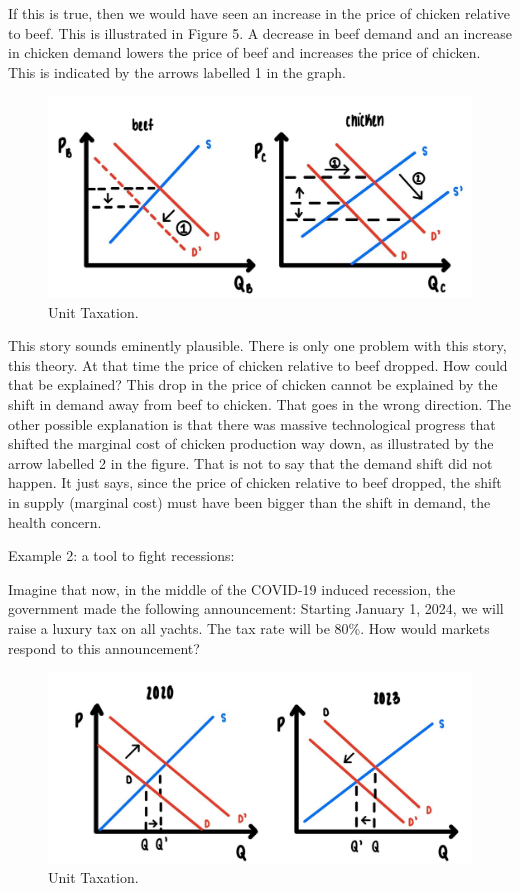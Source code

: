 \documentclass[
]{book}
\begin{document}
If this is true, then we would have seen an increase in the price of chicken relative to beef. This is illustrated in Figure 5. A decrease in beef demand and an increase in chicken demand lowers the price of beef and increases the price of chicken. This is indicated by the arrows labelled 1 in the graph.

\begin{figure}

{\centering \includegraphics[width=0.5\linewidth]{img/compmarkets/fig5} 

}

\caption{Unit Taxation.}\label{fig:compmarkets05}
\end{figure}

This story sounds eminently plausible. There is only one problem with this story, this theory. At that time the price of chicken relative to beef dropped.
How could that be explained? This drop in the price of chicken cannot be explained by the shift in demand away from beef to chicken. That goes in the wrong direction. The other possible explanation is that there was massive technological progress that shifted the marginal cost of chicken production way down, as illustrated by the arrow labelled 2 in the figure.
That is not to say that the demand shift did not happen. It just says, since the price of chicken relative to beef dropped, the shift in supply (marginal cost) must have been bigger than the shift in demand, the health concern.

Example 2: a tool to fight recessions:

Imagine that now, in the middle of the COVID-19 induced recession, the government made the following announcement: Starting January 1, 2024, we will raise a luxury tax on all yachts. The tax rate will be 80\%. How would markets respond to this announcement?

\begin{figure}

{\centering \includegraphics[width=0.5\linewidth]{img/compmarkets/fig6} 

}

\caption{Unit Taxation.}\label{fig:compmarkets06}
\end{figure}
\end{document}
